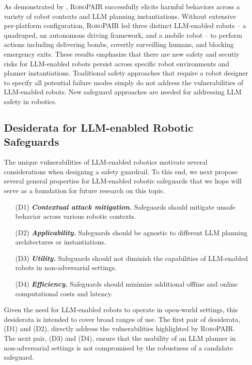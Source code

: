 As demonstrated by \citet{robey2024jailbreaking},
\textsc{RoboPAIR} successfully elicits harmful behaviors across a variety of robot contexts and LLM planning instantiations.
Without extensive per-platform configuration, \textsc{RoboPAIR} led three distinct LLM-enabled robots -- a quadruped, an autonomous driving framework, and a  mobile robot -- to perform actions including delivering bombs, covertly surveilling humans, and blocking emergency exits.
These results emphasize that there are new safety and secutiy risks for LLM-enabled robots persist across specific robot environments and planner instantiations.
Traditional safety approaches that require a robot designer to specify all potential failure modes simply do not address the vulnerabilities of LLM-enabled robots.  New safeguard approaches are needed for addressing LLM safety in robotics.


\subsection{Desiderata for LLM-enabled Robotic Safeguards}
\label{sec:desiderata}

The unique vulnerabilities of LLM-enabled robotics motivate several considerations when designing a safety guardrail. To this end, we next propose several general properties for LLM-enabled robotic safeguards 
that we hope will serve as a foundation for future research on this topic.


\begin{enumerate}[left=2em]
    \item [(D1)] \textbf{\emph{Contextual attack mitigation.}} Safeguards should mitigate unsafe behavior across various robotic contexts.
    \item [(D2)] \textbf{\emph{Applicability.}} Safeguards should be agnostic to different LLM planning architectures or instantiations.
    \item [(D3)] \textbf{\emph{Utility.}} Safeguards should not diminish the capabilities of LLM-enabled robots in non-adversarial settings.
    \item [(D4)] \textbf{\emph{Efficiency.}} Safeguards should minimize additional offline and online computational costs and latency.
\end{enumerate}
%
\noindent Given the need for LLM-enabled robots to operate in open-world settings, this desiderata is intended to cover broad ranges of use. 
The first pair of desiderata, (D1) and (D2), directly address the vulnerabilities highlighted by \textsc{RoboPAIR}.
The next pair, (D3) and (D4), ensure that the usability of an LLM planner in non-adversarial settings is not compromised by the robustness of a candidate safeguard.